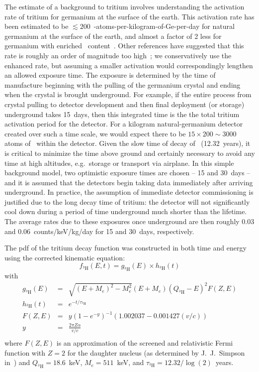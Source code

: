 The estimate of a background to tritium involves understanding the activation rate of tritium for germanium at the surface of the earth.  This activation rate has been estimated to be $\lesssim200$~\hthree-atoms-per-kilogram-of-Ge-per-day for natural germanium at the surface of the earth, and almost a factor of 2 less for germanium with enriched \gersevensix~content~\cite{Avi92}.  Other references have suggested that this rate is roughly an order of magnitude too high~\cite{Col92,Mei:2009vn}; we conservatively use the enhanced rate, but assuming a smaller activation would correspondingly lengthen an allowed exposure time.  The exposure is determined by the time of manufacture beginning with the pulling of the germanium crystal and ending when the crystal is brought underground.  For example, if the entire process from crystal pulling to detector development and then final deployment (or storage) underground takes 15~days, then this integrated time is the the total tritium activation period for the detector.  For a kilogram natural-germanium detector created over such a time scale, we would expect there to be $15\times200\sim3000$ atoms of \hthree~within the detector.  Given the slow time of decay of \hthree~(12.32~years), it is critical to minimize the time above ground and certainly necessary to avoid any time at high altitudes, e.g.~storage or transport via airplane.  In this simple background model, two optimistic exposure times are chosen -- 15 and 30~days -- and it is assumed that the detectors begin taking data immediately after arriving underground.  In practice, the assumption of immediate detector commissioning is justified due to the long decay time of tritium: the detector will not significantly cool down during a period of time underground much shorter than the lifetime.  The average rates due to these exposures once underground are then roughly 0.03 and 0.06~counts/keV/kg/day for 15 and 30~days, respectively.  

The pdf of the tritium decay function was constructed in both time and energy using the corrected kinematic equation:
		\begin{equation}
			f_{^{3}\text{H}}\left(E, t\right)  =  g_{^{3}\text{H}}\left(E\right) \times h_{^{3}\text{H}}\left(t\right) 
		\end{equation}
		with
		\begin{eqnarray}
		g_{^{3}\text{H}}\left(E\right) & = & \sqrt{(E + M_e)^2 - M_e^2} \left(
			E + M_e \right) \left( Q_{^3\text{H}} - E \right)^2 F(Z, E) \\
h_{^{3}\text{H}}\left(t\right) & = & e^{-t/\tau_{^3\text{H}}} \\
		F(Z,E) & =  & y ( 1 - e^{-y} )^{-1} (1.002037 - 0.001427(v/c)) \\
		y & = & \frac{2 \pi Z \alpha}{v/c} \\
		\end{eqnarray}
		where $F(Z,E)$ is an approximation of the screened and relativistic Fermi function with $Z = 2$ for the daughter nucleus (as determined by J.~J.~Simpson in~\cite{Simp81}) and $Q_{^3\text{H}}=18.6$~keV, $M_{e}=511$~keV, and $\tau_{^3\text{H}} = 12.32 / \log(2)$~years.  
		
